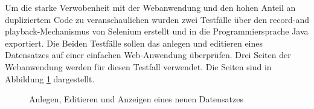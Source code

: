 Um die starke Verwobenheit mit der Webanwendung und den hohen Anteil an dupliziertem Code zu veranschaulichen wurden zwei Testfälle über den \grq record-and playback\grq -Mechanismus von Selenium erstellt und in die Programmiersprache Java exportiert.
Die Beiden Testfälle sollen das anlegen und editieren eines Datensatzes auf einer einfachen Web-Anwendung überprüfen.
Drei Seiten der Webanwendung werden für diesen Testfall verwendet. Die Seiten sind in Abbildung \ref{fig:toDoApp} dargestellt.

\begin{figure}[htb]

 \caption{Anlegen, Editieren und Anzeigen eines neuen Datensatzes}
  \label{fig:toDoApp}
\end{figure}


